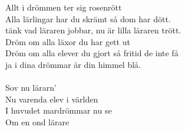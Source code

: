 \documentclass[a6paper, 10pt, twoside]{article}
\begin{document}
\begin{lyrics}
Allt i drömmen ter sig rosenrött\\
Alla lärlingar har du skrämt så dom har dött.\\
tänk vad läraren jobbar, nu är lilla läraren trött.\\
Dröm om alla läxor du har gett ut\\
Dröm om alla elever du gjort så fritid de inte få\\
ja i dina drömmar är din himmel blå.\\
\vspace{5pt}\\
Sov nu lärarn’\\
Nu varenda elev i världen\\
I huvudet mardrömmar nu se\\
Om en ond lärare
\end{lyrics}
\end{document}
